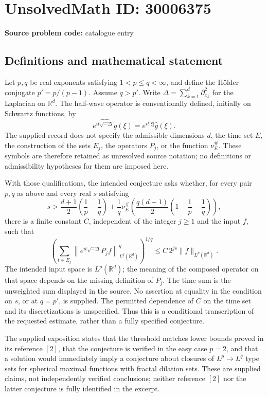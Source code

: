 \documentclass[11pt]{article}
\newcommand{\R}{\mathbb{R}}
\begin{document}
\section*{UnsolvedMath ID: 30006375}
\textbf{Source problem code:} catalogue entry
\subsection{Definitions and mathematical statement}
Let \(p,q\) be real exponents satisfying \(1<p\leq q<\infty\), and define the Hölder conjugate \(p'=p/(p-1)\). Assume \(q>p'\). Write \(\Delta=\sum_{k=1}^{d}\partial_{x_k}^{2}\) for the Laplacian on \(\R^d\). The half-wave operator is conventionally defined, initially on Schwartz functions, by
\[
\widehat{e^{it\sqrt{-\Delta}}g}(\xi)=e^{it|\xi|}\widehat g(\xi).
\]
The supplied record does not specify the admissible dimensions \(d\), the time set \(E\), the construction of the sets \(E_j\), the operators \(P_j\), or the function \(\nu_E^{\#}\). These symbols are therefore retained as unresolved source notation; no definitions or admissibility hypotheses for them are imposed here.

With those qualifications, the intended conjecture asks whether, for every pair \(p,q\) as above and every real \(s\) satisfying
\[
s>\frac{d+1}{2}\left(\frac1p-\frac1q\right)
+\frac1q\nu_E^{\#}\!\left(\frac{q(d-1)}2\left(1-\frac1p-\frac1q\right)\right),
\]
there is a finite constant \(C\), independent of the integer \(j\geq1\) and the input \(f\), such that
\[
\left(\sum_{t\in E_j}
\left\lVert e^{it\sqrt{-\Delta}}P_jf\right\rVert_{L^q(\R^d)}^q\right)^{1/q}
\leq C\,2^{js}\lVert f\rVert_{L^p(\R^d)}.
\]
The intended input space is \(L^p(\R^d)\); the meaning of the composed operator on that space depends on the missing definition of \(P_j\). The time sum is the unweighted sum displayed in the source. No assertion at equality in the condition on \(s\), or at \(q=p'\), is supplied. The permitted dependence of \(C\) on the time set and its discretizations is unspecified. Thus this is a conditional transcription of the requested estimate, rather than a fully specified conjecture.

The supplied exposition states that the threshold matches lower bounds proved in its reference \([2]\), that the conjecture is verified in the easy case \(p=2\), and that a solution would immediately imply a conjecture about closures of \(L^p\to L^q\) type sets for spherical maximal functions with fractal dilation sets. These are supplied claims, not independently verified conclusions; neither reference \([2]\) nor the latter conjecture is fully identified in the excerpt.
\end{document}
